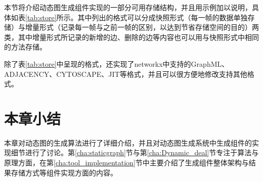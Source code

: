 本节将介绍动态图生成组件实现的一部分可用存储结构，并且用示例加以说明，具体如表\ref{tab:store}所示。其中列出的格式可以分成快照形式（每一帧的数据单独存储）与增量形式（记录每一帧与之前一帧的区别，以达到节省存储空间的目的）两类，其中增量形式所记录的新增的边、删除的边等内容也可以用与快照形式中相同的方法存储。

除了表\ref{tab:store}中呈现的格式，还实现了networkx中支持的GraphML、ADJACENCY、CYTOSCAPE、JIT等格式，并且可以很方便地修改支持其他格式。

\section{本章小结}

本章对动态图的生成算法进行了详细介绍，并且对动态图生成系统中生成组件的实现细节进行了讨论。第\ref{cha:staticgraph}节与第\ref{cha:Dynamic_deal}节专注于算法与原理方面，在第\ref{cha:tool_implementation}节中主要介绍了生成组件整体架构与结果存储方式等组件实现方面的内容。